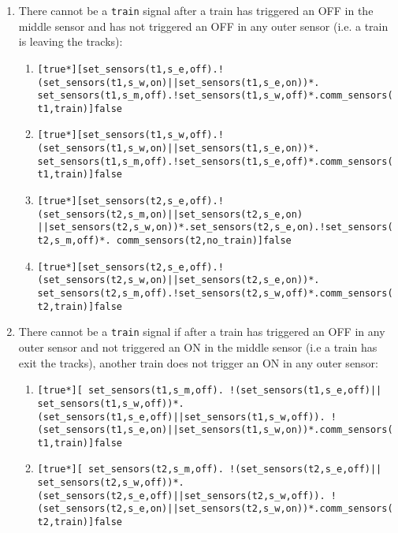 \documentclass[final]{report}
\begin{document}
\begin{enumerate}
\begin{enumerate}[label=\roman*]
\end{enumerate}

\item There cannot be a \texttt{train} signal after a train has triggered an OFF in the middle sensor and has not triggered an OFF in any outer sensor (i.e. a train is leaving the
tracks):
\begin{enumerate}[label=\roman*]
\item \texttt{[true*][set\_sensors(t1,s\_e,off).!(set\_sensors(t1,s\_w,on)||set\_sensors(t1,s\_e,on))*. set\_sensors(t1,s\_m,off).!set\_sensors(t1,s\_w,off)*.comm\_sensors(t1,train)]false}


\item \texttt{[true*][set\_sensors(t1,s\_w,off).!(set\_sensors(t1,s\_w,on)||set\_sensors(t1,s\_e,on))*. set\_sensors(t1,s\_m,off).!set\_sensors(t1,s\_e,off)*.comm\_sensors(t1,train)]false}

\item \texttt{[true*][set\_sensors(t2,s\_e,off).!(set\_sensors(t2,s\_m,on)||set\_sensors(t2,s\_e,on) ||set\_sensors(t2,s\_w,on))*.set\_sensors(t2,s\_e,on).!set\_sensors(t2,s\_m,off)*. comm\_sensors(t2,no\_train)]false}


\item \texttt{[true*][set\_sensors(t2,s\_e,off).!(set\_sensors(t2,s\_w,on)||set\_sensors(t2,s\_e,on))*. set\_sensors(t2,s\_m,off).!set\_sensors(t2,s\_w,off)*.comm\_sensors(t2,train)]false}

\end{enumerate}

\item There cannot be a \texttt{train} signal if after a train has triggered an OFF in any outer sensor and not triggered an ON in the middle sensor (i.e a train has exit
 the tracks), another train does not trigger an ON in any outer sensor: 
\begin{enumerate}[label=\roman*]
\item \texttt{[true*][ set\_sensors(t1,s\_m,off). !(set\_sensors(t1,s\_e,off)|| set\_sensors(t1,s\_w,off))*.(set\_sensors(t1,s\_e,off)||set\_sensors(t1,s\_w,off)). !(set\_sensors(t1,s\_e,on)||set\_sensors(t1,s\_w,on))*.comm\_sensors(t1,train)]false}

\item \texttt{[true*][ set\_sensors(t2,s\_m,off). !(set\_sensors(t2,s\_e,off)|| set\_sensors(t2,s\_w,off))*.(set\_sensors(t2,s\_e,off)||set\_sensors(t2,s\_w,off)). !(set\_sensors(t2,s\_e,on)||set\_sensors(t2,s\_w,on))*.comm\_sensors(t2,train)]false}
 
\end{enumerate}

\end{enumerate}
\end{document}
